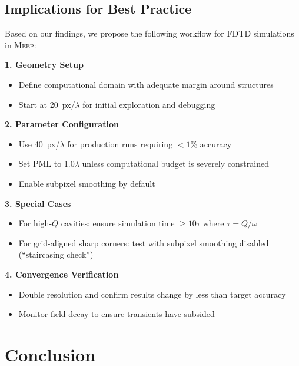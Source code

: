 \documentclass[12pt, a4paper]{article}
\newcommand{\meep}{\textsc{Meep}}
\newcommand{\fdtd}{\textsc{FDTD}}
\begin{document}
\subsection{Implications for Best Practice}

Based on our findings, we propose the following workflow for \fdtd{} simulations in \meep{}:

\begin{tcolorbox}[colback=blue!5!white, colframe=blue!50!black, coltitle=black, title=\textbf{Recommended Workflow for FDTD Simulations}, fonttitle=\bfseries]
\textbf{1. Geometry Setup}
\begin{itemize}[leftmargin=*, nosep]
    \item Define computational domain with adequate margin around structures
    \item Start at 20~px/$\lambda$ for initial exploration and debugging
\end{itemize}

\textbf{2. Parameter Configuration}
\begin{itemize}[leftmargin=*, nosep]
    \item Use 40~px/$\lambda$ for production runs requiring $<1\%$ accuracy
    \item Set PML to 1.0$\lambda$ unless computational budget is severely constrained
    \item Enable subpixel smoothing by default
\end{itemize}

\textbf{3. Special Cases}
\begin{itemize}[leftmargin=*, nosep]
    \item For high-$Q$ cavities: ensure simulation time $\geq 10\tau$ where $\tau = Q/\omega$
    \item For grid-aligned sharp corners: test with subpixel smoothing disabled (``staircasing check'')
\end{itemize}

\textbf{4. Convergence Verification}
\begin{itemize}[leftmargin=*, nosep]
    \item Double resolution and confirm results change by less than target accuracy
    \item Monitor field decay to ensure transients have subsided
\end{itemize}
\end{tcolorbox}


\section{Conclusion}
\label{sec:conclusion}
\end{document}
